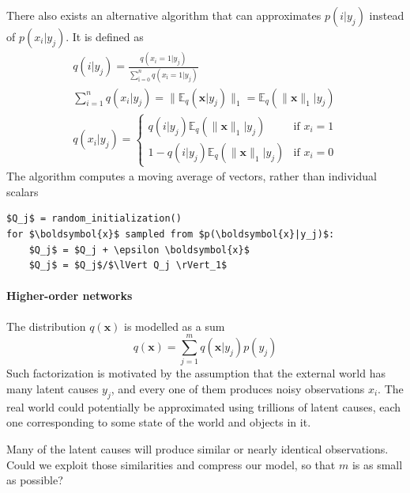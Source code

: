 \documentclass[12pt]{article}
\begin{document}
There also exists an alternative algorithm that can approximates $p(i|y_j)$ instead of $p(x_i|y_j)$. It is defined as
\begin{gather*}
	q(i|y_j) = \frac{q(x_i=1|y_j)}{\sum_{ï=0}^n{q(x_{ï}=1|y_j)}} \\
	\sum_{i=1}^n q(x_{i}|y_j) =  \lVert \mathbb{E}_q( \boldsymbol{x}|y_j) \rVert_1 = \mathbb{E}_q(\lVert \boldsymbol{x} \rVert_1|y_j) \\
	q(x_i|y_j) = \begin{cases}
		q(i|y_j)\mathbb{E}_q(\lVert \boldsymbol{x} \rVert_1|y_j)&\text{if }x_i=1 \\
		1-q(i|y_j)\mathbb{E}_q(\lVert \boldsymbol{x} \rVert_1|y_j)&\text{if }x_i=0 
	\end{cases}
\end{gather*}
The algorithm computes a moving average of vectors, rather than individual scalars
\begin{lstlisting}
$Q_j$ = random_initialization()
for $\boldsymbol{x}$ sampled from $p(\boldsymbol{x}|y_j)$:
    $Q_j$ = $Q_j + \epsilon \boldsymbol{x}$ 
    $Q_j$ = $Q_j$/$\lVert Q_j \rVert_1$
\end{lstlisting}

\paragraph{Higher-order networks}

The distribution $q(\boldsymbol{x})$ is modelled as a sum
\[
q(\boldsymbol{x}) = \sum_{j=1}^{m}q(\boldsymbol{x}|y_j)p(y_j) 
\]
Such factorization is motivated by the assumption that the external world has many latent causes $y_j$, and every one of them produces noisy observations $x_i$. The real world could potentially be approximated using trillions of latent causes, each one corresponding to some state of the world and objects in it. 

Many of the latent causes will produce similar or nearly identical observations. Could we exploit those similarities and compress our model, so that $m$ is as small as possible? 
\end{document}

